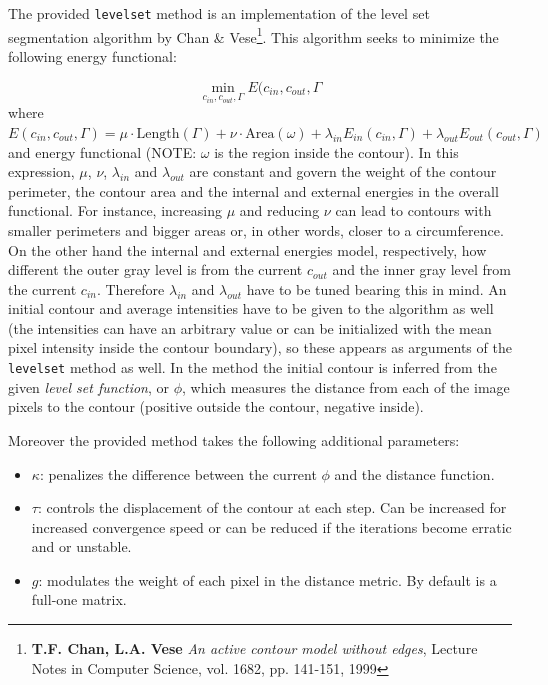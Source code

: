 The provided \texttt{levelset} method is an implementation of the level set segmentation algorithm by  Chan \& Vese\footnote{\textbf{T.F. Chan, L.A. Vese}\emph{ An active contour model without edges}, Lecture Notes in Computer Science, vol. 1682, pp. 141-151, 1999}. This algorithm seeks to minimize the following energy functional:

\[ \min_{c_{in}, c_{out}, \Gamma} E(c_{in}, c_{out}, \Gamma \]
where $ E(c_{in}, c_{out}, \Gamma) = \mu \cdot \mathrm{Length}(\Gamma) + \nu \cdot \mathrm{Area}(\omega) + \lambda_{in} E_{in} (c_{in}, \Gamma) + \lambda_{out} E_{out} (c_{out}, \Gamma) $ and energy functional (NOTE: $ \omega $ is the region inside the contour). In this expression, $ \mu $, $ \nu $, $ \lambda_{in} $ and $ \lambda_{out} $ are constant and govern the weight of the contour perimeter, the contour area and the internal and external energies in the overall functional. For instance, increasing $ \mu $ and reducing $ \nu $ can lead to contours with smaller perimeters and bigger areas or, in other words, closer to a circumference. On the other hand the internal and external energies model, respectively, how different the outer gray level is from the current $ c_{out} $ and the inner gray level from the current $ c_{in} $. Therefore $ \lambda_{in} $ and $ \lambda_{out} $ have to be tuned bearing this in mind. An initial contour and average intensities have to be given to the algorithm as well (the intensities can have an arbitrary value or can be initialized with the mean pixel intensity inside the contour boundary), so these appears as arguments of the \texttt{levelset} method as well. In the method the initial contour is inferred from the given \emph{level set function}, or $ \phi $, which measures the distance from each of the image pixels to the contour (positive outside the contour, negative inside).

Moreover the provided method takes the following additional parameters:
\begin{itemize}
	\item $ \kappa $: penalizes the difference between the current $ \phi $ and the distance function.
	\item $ \tau $: controls the displacement of the contour at each step. Can be increased for increased convergence speed or can be reduced if the iterations become erratic and or unstable.
	\item $ g $: modulates the weight of each pixel in the distance metric. By default is a full-one matrix.
\end{itemize}

